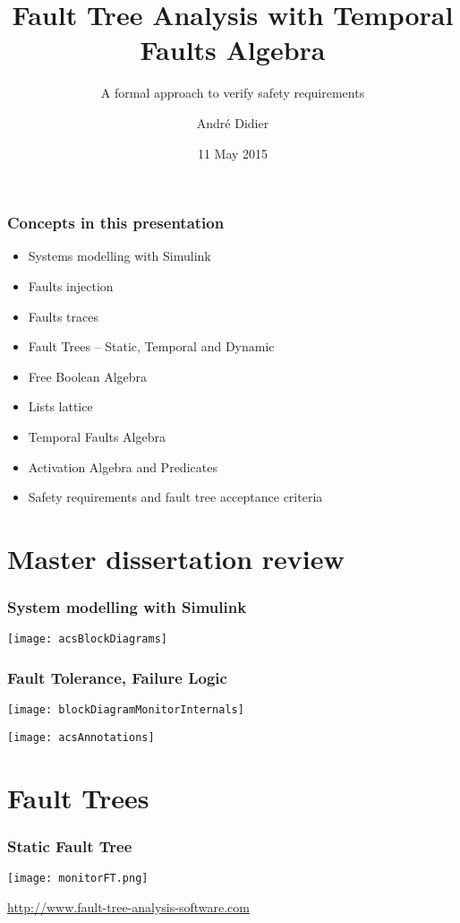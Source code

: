 \documentclass{beamer}
\title{Fault Tree Analysis with Temporal Faults Algebra}
\subtitle{A formal approach to verify safety requirements}
\author{André Didier}
\date{11 May 2015}
\begin{document}
\begin{frame}
\titlepage
\end{frame}

\begin{frame}
\frametitle{Concepts in this presentation}

\begin{itemize}
  \item Systems modelling with Simulink
  \item Faults injection
  \item Faults traces
  \item Fault Trees -- Static, Temporal and Dynamic
  \item Free Boolean Algebra
  \item Lists lattice
  \item Temporal Faults Algebra
  \item Activation Algebra and Predicates
  \item Safety requirements and fault tree acceptance criteria
\end{itemize}
\end{frame}

\section{Master dissertation review}

\begin{frame}
\frametitle{System modelling with Simulink}
\texttt{[image: acsBlockDiagrams]}
\end{frame}

\begin{frame}
\frametitle{Fault Tolerance, Failure Logic}
\texttt{[image: blockDiagramMonitorInternals]}\par
\texttt{[image: acsAnnotations]}
\end{frame}

\section{Fault Trees}

\begin{frame}
\frametitle{Static Fault Tree}
\texttt{[image: monitorFT.png]}\par
\hfill{\tiny\color{100PANTONECOOLGRAY10CV}
\url{http://www.fault-tree-analysis-software.com}}\hspace{9mm}
\end{frame}
\end{document}
